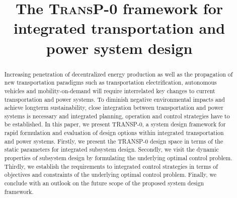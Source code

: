 \title{The \textsc{TransP-0} framework for integrated transportation and power system design}

\author{
	\and
}

\maketitle

\begin{abstract}
	Increasing penetration of decentralized energy production as well as the propagation of new transportation paradigms such as transportation electrification, autonomous vehicles and mobility-on-demand will require interrelated key changes to current transportation and power systems.
	To diminish negative environmental impacts and achieve longterm sustainability, close integration between transportation and power systems is necessary and integrated planning, operation and control strategies have to be established. In this paper, we present TRANSP-0, a system design framework for rapid 
	formulation and evaluation of design options within integrated transportation and power systems. Firstly, we present the TRANSP-0 design space in terms of the static parameters for integrated subsystem design. Secondly, we visit the dynamic properties of subsystem design by formulating the underlying optimal control problem. Thirdly, we establish the requirements to integrated control strategies in terms of objectives and constraints of the underlying optimal control problem. Finally, we conclude with an outlook on the future scope of the proposed system design framework.
	
\end{abstract}
